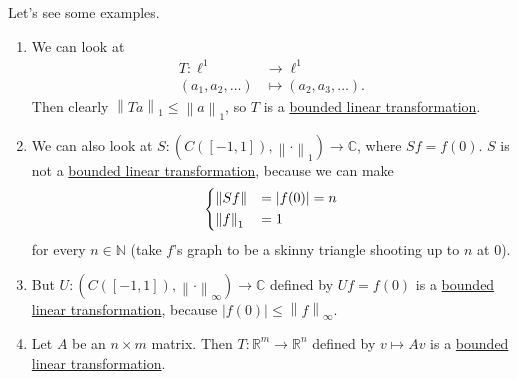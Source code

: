 \begin{eg}
	Let's see some examples.
	\begin{enumerate}[(1)]
		\item We can look at
		      \[
			      \begin{split}
				      T \colon \ell^1       & \to \ell^1                \\
				      (a_1,a_2,\dots) & \mapsto (a_2,a_3,\dots).
			      \end{split}
		      \]
		      Then clearly \(\left\lVert Ta\right\rVert_1 \leq \left\lVert a\right\rVert _1\), so \(T\) is a \hyperref[def:bounded-linear-transformation]{bounded linear transformation}.
		\item We can also look at \(S \colon (C([-1,1]),\left\lVert \cdot\right\rVert _1) \to \mathbb{C}\), where \(Sf = f(0)\). \(S\) is not a \hyperref[def:bounded-linear-transformation]{bounded linear transformation},
		      because we can make
		      \[
			      \begin{dcases}
				      \left\lVert Sf\right\rVert  & = \left\vert f(0) \right\vert  = n \\
				      \left\lVert f\right\rVert_1 & = 1
			      \end{dcases}
		      \]
		      for every \(n \in \mathbb{N}\) (take \(f\)'s graph to be a skinny triangle shooting up to \(n\) at \(0\)).
		\item But \(U \colon (C([-1,1]), \left\lVert \cdot\right\rVert _\infty) \to \mathbb{C}\) defined by \(Uf = f(0)\) is a \hyperref[def:bounded-linear-transformation]{bounded linear transformation},
		      because \(\left\vert f(0) \right\vert \leq \left\lVert f\right\rVert_\infty\).
		\item Let \(A\) be an \(n \times m\) matrix. Then \(T \colon \mathbb{R}^m \to \mathbb{R}^n\) defined by \(v \mapsto Av\) is a
		      \hyperref[def:bounded-linear-transformation]{bounded linear transformation}.


\end{enumerate}
\end{eg}
